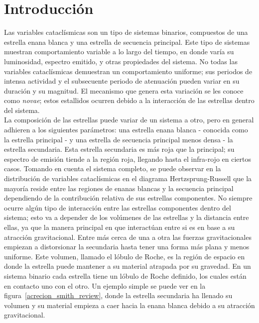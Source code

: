 \chapter{Introducción}

Las variables cataclísmicas son un tipo de sistemas binarios, compuestos de una estrella enana blanca y una estrella de secuencia principal. Este tipo de sistemas muestran comportamiento variable a lo largo del tiempo, en donde varía su luminosidad, espectro emitido, y otras propiedades del sistema. No todas las variables cataclísmicas demuestran un comportamiento uniforme; sus periodos de intensa actividad y el subsecuente periodo de atenuación pueden variar en su duración y su magnitud. El mecanismo que genera esta variación se les conoce como \textit{novae}; estos estallidos ocurren debido a la interacción de las estrellas dentro del sistema.
\\\newline
La composición de las estrellas puede variar de un sistema a otro, pero en general adhieren a los siguientes parámetros: una estrella enana blanca - conocida como la estrella principal - y una estrella de secuencia principal menos densa - la estrella secundaria. Esta estrella secundaria es más roja que la principal; su espectro de emisión tiende a la región roja, llegando hasta el infra-rojo en ciertos casos. Tomando en cuenta el sistema completo, se puede observar en la distribución de variables cataclísmicas en el diagrama Hertzsprung-Russell que la mayoría reside entre las regiones de enanas blancas y la secuencia principal dependiendo de la contribución relativa de sus estrellas componentes. \cite*{disentanglingGaiaHR} No siempre ocurre algún tipo de interacción entre las estrellas componentes dentro del sistema; esto va a depender de los volúmenes de las estrellas y la distancia entre ellas, ya que la manera principal en que interactúan entre si es en base a su atracción gravitacional. Entre más cerca de una a otra las fuerzas gravitacionales empiezan a distorsionar la secundaria hasta tener una forma más plana y menos uniforme. Este volumen, llamado el lóbulo de Roche, es la región de espacio en donde la estrella puede mantener a su material atrapada por su gravedad. En un sistema binario cada estrella tiene un lóbulo de Roche definido, los cuales están en contacto uno con el otro. Un ejemplo simple se puede ver en la figura~\ref{acrecion_smith_review}, donde la estrella secundaria ha llenado su volumen y su material empieza a caer hacia la enana blanca debido a su atracción gravitacional.
\\\newline
